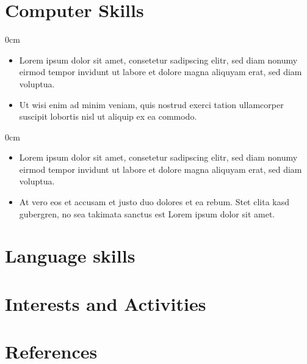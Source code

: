 \documentclass[color=black, style=classic, DIV20]{komacv}
\newcommand{\cvpart}[1]{\vspace{-0.45cm}\section{#1}\vspace{-0.12cm}}
\newenvironment{cvcontent}{\begin{addmargin}[3.38cm]{0cm}\begin{itemize}\setlength{\itemsep}{-0.07cm}}{\end{itemize}\end{addmargin}\vspace{0.15cm}}
\begin{document}

\cvpart{Computer Skills}

\begin{cvcontent}
\item Lorem ipsum dolor sit amet, consetetur sadipscing elitr, sed diam nonumy eirmod tempor invidunt ut labore et dolore magna aliquyam erat, sed diam voluptua.
\item Ut wisi enim ad minim veniam, quis nostrud exerci tation ullamcorper suscipit lobortis nisl ut aliquip ex ea commodo.
\end{cvcontent}

\begin{cvcontent}
\item Lorem ipsum dolor sit amet, consetetur sadipscing elitr, sed diam nonumy eirmod tempor invidunt ut labore et dolore magna aliquyam erat, sed diam voluptua.
\item At vero eos et accusam et justo duo dolores et ea rebum. Stet clita kasd gubergren, no sea takimata sanctus est Lorem ipsum dolor sit amet.
\end{cvcontent}


\cvpart{Language skills}


\cvpart{Interests and Activities}


\cvpart{References}
\end{document}
